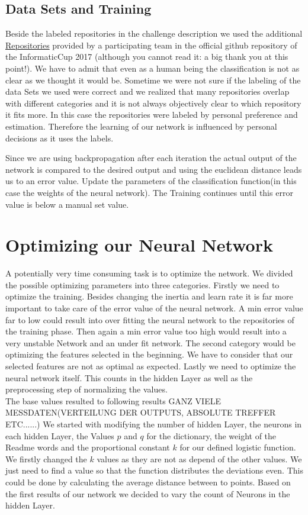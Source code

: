 \documentclass[paper=A4,pagesize=auto,12pt,headinclude=true,footinclude=true,BCOR=0mm,DIV=calc]{scrartcl}
\begin{document}
	\subsection{Data Sets and Training}
	Beside the labeled repositories in the challenge description we used the additional \hyperref[src:Repositories]{Repositories} provided by a participating team in the official github repository of the InformaticCup 2017 (although you cannot read it: a big thank you at this point!). We have to admit that even as a human being the classification is not as clear as we thought it would be. Sometime we were not sure if the labeling of the data Sets we used were correct and we realized that many repositories overlap with different categories and it is not always objectively clear to which repository it fits more. In this case the repositories were labeled by personal preference and estimation. Therefore the learning of our network is influenced by personal decisions as it uses the labels.
	
	
	Since we are using backpropagation after each iteration the actual output of the network is compared to the desired output and using the euclidean distance leads us to an error value. Update the parameters of the classification function(in this case the weights of the neural network). The Training continues until this error value is below a manual set value.
	
	
	
	\section{Optimizing our Neural Network }
	A potentially very time consuming task is to optimize the network. We divided the possible optimizing parameters into three categories. Firstly we need to optimize the training. Besides changing the inertia and learn rate it is far more important to take care of the error value of the neural network. A min error value far to low could result into over fitting the neural network to the repositories of the training phase. Then again a min error value too high would result into a very unstable Network and an under fit network. 
	The second category would be optimizing the features selected in the beginning. We have to consider that our selected features are not as optimal as expected.
	Lastly we need to optimize the neural network itself. This counts in the hidden Layer as well as the preprocessing step of normalizing the values.\\
	The base values resulted to following results
	GANZ VIELE MESSDATEN(VERTEILUNG DER OUTPUTS, ABSOLUTE TREFFER ETC......)
	We started with modifying the number of hidden Layer, the neurons in each hidden Layer, the Values $p$ and $q$ for the dictionary, the weight of the Readme words and the proportional constant $k$ for our defined logistic function.
	We firstly changed the $k$ values as they are not as depend of the other values. We just need to find a value so that the function distributes the deviations even. This could be done by calculating the average distance between to points.
	Based on the first results of our network we decided to vary the count of Neurons in the hidden Layer.
	
\end{document}
